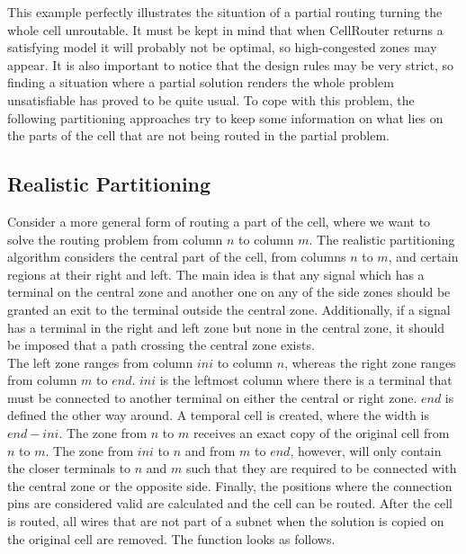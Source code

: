 This example perfectly illustrates the situation of a partial routing turning the whole cell unroutable. It must be kept in mind that when CellRouter returns a satisfying model it will probably not be optimal, so high-congested zones may appear. It is also important to notice that the design rules may be very strict, so finding a situation where a partial solution renders the whole problem unsatisfiable has proved to be quite usual. To cope with this problem, the following partitioning approaches try to keep some information on what lies on the parts of the cell that are not being routed in the partial problem.

\subsection{Realistic Partitioning}

Consider a more general form of routing a part of the cell, where we want to solve the routing problem from column $n$ to column $m$. The realistic partitioning algorithm considers the central part of the cell, from columns $n$ to $m$, and certain regions at their right and left. The main idea is that any signal which has a terminal on the central zone and another one on any of the side zones should be granted an exit to the terminal outside the central zone. Additionally, if a signal has a terminal in the right and left zone but none in the central zone, it should be imposed that a path crossing the central zone exists. \\

The left zone ranges from column $ini$ to column $n$, whereas the right zone ranges from column $m$ to $end$. $ini$ is the leftmost column where there is a terminal that must be connected to another terminal on either the central or right zone. $end$ is defined the other way around. A temporal cell is created, where the width is $end - ini$. The zone from $n$ to $m$ receives an exact copy of the original cell from $n$ to $m$. The zone from $ini$ to $n$ and from $m$ to $end$, however, will only contain the closer terminals to $n$ and $m$ such that they are required to be connected with the central zone or the opposite side. Finally, the positions where the connection pins are considered valid are calculated and the cell can be routed. After the cell is routed, all wires that are not part of a subnet when the solution is copied on the original cell are removed. The function looks as follows. \\

